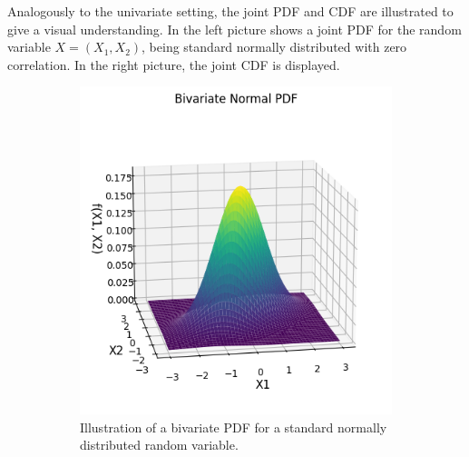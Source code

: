 Analogously to the univariate setting, the joint \gls{PDF} and \gls{CDF} are illustrated to give a visual understanding. In  the left picture shows a joint \gls{PDF} for the random variable $X = (X_1, X_2)$, being standard normally distributed with zero correlation. In the right picture, the joint \gls{CDF} is displayed. 


\begin{figure}[h]
    \centering
    \begin{subfigure}[t]{0.45\linewidth}
        \centering
        \includegraphics[width=\linewidth]{3Theory/pictures/BivariatePDF.png}
        \caption{Illustration of a bivariate \gls{PDF} for a standard normally distributed random variable.}
        \label{fig:PDF2d}
    \end{subfigure}
    \hfill
    \begin{subfigure}[t]{0.45\linewidth}

\end{subfigure}
\end{figure}
